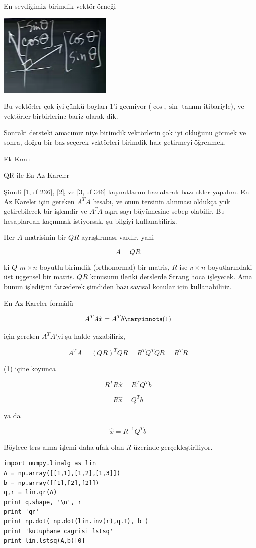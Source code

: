 \documentclass[12pt,fleqn]{article}\usepackage{../../common}
\begin{document}
En sevdiğimiz birimdik vektör örneği 

\includegraphics[height=4cm]{16_8.png}

Bu vektörler çok iyi çünkü boyları 1'i geçmiyor ($\cos,\sin$ tanımı
itibariyle), ve vektörler birbirlerine bariz olarak dik. 

Sonraki dersteki amacımız niye birimdik vektörlerin çok iyi olduğunu görmek
ve sonra, doğru bir baz seçerek vektörleri birimdik hale getirmeyi
öğrenmek. 

Ek Konu

QR ile En Az Kareler 

Şimdi [1, sf 236], [2], ve [3, sf 346] kaynaklarını baz alarak bazı ekler
yapalım. En Az Kareler için gereken $A^TA$ hesabı, ve onun tersinin
alınması oldukça yük getirebilecek bir işlemdir ve $A^TA$ aşırı sayı
büyümesine sebep olabilir. Bu hesaplardan kaçınmak istiyorsak, şu bilgiyi
kullanabiliriz. 

Her $A$ matrisinin bir $QR$ ayrıştırması vardır, yani 

$$ A = QR $$

ki $Q$ $m \times n$ boyutlu birimdik (orthonormal) bir matris, $R$ ise $n
\times n$ boyutlarındaki üst üçgensel bir matris. $QR$ konusunu ileriki
derslerde Strang hoca işleyecek. Ama bunun işlediğini farzederek şimdiden
bazı sayısal konular için kullanabiliriz.

En Az Kareler formülü

$$ 
A^TA \hat{x} = A^Tb 
\mlabel{1} 
$$

için gereken $A^TA$'yi şu halde yazabiliriz,

$$ A^TA = (QR)^TQR = R^TQ^TQR = R^TR $$

(1) içine koyunca

$$ R^TR \hat{x} = R^TQ^Tb $$

$$ R \hat{x} = Q^Tb $$

ya da 

$$ \hat{x} = R^{-1}Q^Tb $$

Böylece ters alma işlemi daha ufak olan $R$ üzerinde gerçekleştiriliyor. 

\begin{verbatim}
import numpy.linalg as lin
A = np.array([[1,1],[1,2],[1,3]])
b = np.array([[1],[2],[2]])
q,r = lin.qr(A)
print q.shape, '\n', r
print 'qr'
print np.dot( np.dot(lin.inv(r),q.T), b )
print 'kutuphane cagrisi lstsq'
print lin.lstsq(A,b)[0]
\end{verbatim}
\end{document}
